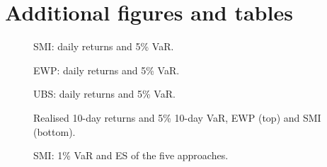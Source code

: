 \section{Additional figures and tables}\label{sec:appendix}

\begin{figure}[H]\centering
{}
\caption{SMI: daily returns and 5\% VaR.}
\end{figure}
\begin{figure}[H]\centering
{}
\caption{EWP: daily returns and 5\% VaR.}
\end{figure}
\begin{figure}[H]\centering
{}
\caption{UBS: daily returns and 5\% VaR.}
\end{figure}


\begin{figure}[H]\centering
{}
\caption{Realised 10-day returns and 5\% 10-day VaR, EWP (top) and SMI (bottom).}
\end{figure}
\begin{figure}[H]\centering
{}
\caption{SMI: 1\% VaR and ES of the five approaches.}
\end{figure}
